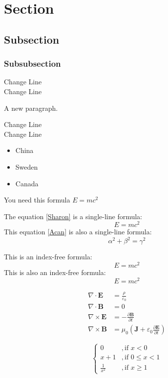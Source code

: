 \documentclass{article}
\begin{document}
	\section{Section}
	\subsection{Subsection}
	\subsubsection{Subsubsection}

	\par Change Line \\ Change Line
	\par A new paragraph.
	\par Change Line \\ Change Line

	\begin{itemize}
		\item China
		\item Sweden
		\item Canada
	\end{itemize}

	You need this formula $E=mc^2$

	The equation \eqref{Sharon} is a single-line formula:
	\begin{equation}\label{Sharon}
		E=mc^2
	\end{equation}
	This equation \eqref{Acan} is also a single-line formula:
	\begin{equation}\label{Acan}
		\alpha^2+\beta^2 = \gamma^2
	\end{equation}

	This is an index-free formula:
	\[E=mc^2\]
	This is also an index-free formula:
	$$E=mc^2$$

	\begin{equation}
		\begin{split}
			\nabla \cdot \mathbf{E} &= \frac{\rho}{\varepsilon_0} \\
    		\nabla \cdot \mathbf{B} &= 0 \\
    		\nabla \times \mathbf{E} &= -\frac{\partial \mathbf{B}}{\partial t} \\
    		\nabla \times \mathbf{B} &= \mu_0\left(\mathbf{J} + \varepsilon_0 \frac{\partial \mathbf{E}}{\partial t}\right)
		\end{split}
	\end{equation}

	\begin{equation}
		\begin{cases}
			0&,\text{if $x<0$} \\
			x+1&,\text{if $0\leq x<1$} \\
			\frac{1}{x^2}&,\text{if $x\geq 1$}
		\end{cases}
	\end{equation}
\end{document}
